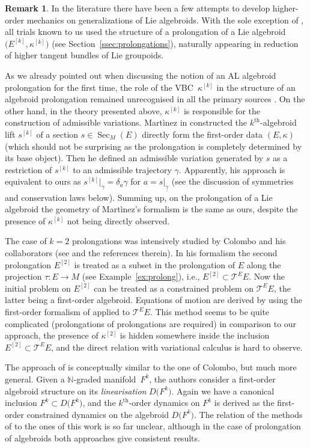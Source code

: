 \documentclass[pdftex]{sigma}
\newcommand{\grB}{{$\N$-graded manifold}}
\newcommand{\ZM}{{VBC}} %
\newcommand{\thh}[1]{#1^{\mathrm{th}}} %
\newcommand{\N}{\mathbb{N}}
\newcommand{\und}{\underline}
\newcommand{\Sec}{\operatorname{Sec}}
\newcommand{\ra}{\rightarrow}
\newcommand{\E}[1]{E^{[#1]}} %
\numberwithin{equation}{section}
\theoremstyle{definition}
\newtheorem{rem}[thm]{Remark}
\begin{document}
\begin{rem}\label{rem:var_calc}In the literature there have been a few attempts to develop higher-order mechanics on generalizations of Lie algebroids. With the sole exception of \cite{BGG_2015}, all trials known to us used the structure of a prolongation of a Lie algebroid $\big(\E{k},\kappa^{[k]}\big)$ (see Section~\ref{ssec:prolongations}), naturally appearing in reduction of higher tangent bundles of Lie groupoids.

As we already pointed out when discussing the notion of an AL algebroid prolongation for the first time, the role of the \ZM\ $\kappa^{[k]}$ in the structure of an algebroid prolongation remained unrecognised in all the primary sources \cite{Col_deDiego_seminar_2011, Martinez_2015, Saunders_2004}. On the other hand, in the theory presented above, $\kappa^{[k]}$ is responsible for the construction of admissible variations. Mart\`{i}nez in \cite{Martinez_2015} constructed the $\thh{k}$-algebroid lift $s^{[k]}$ of a section $s\in\Sec_M(E)$ directly form the first-order data $(E,\kappa)$ (which should not be surprising as the prolongation is completely determined by its base object). Then he defined an admissible variation generated by $s$ as a restriction of $s^{[k]}$ to an admissible trajectory $\gamma$. Apparently, his approach is equivalent to ours as $s^{[k]}|_\gamma=\delta_a\gamma$ for $a=s|_{\und{\gamma}}$ (see the discussion of symmetries and conservation laws below). Summing up, on the prolongation of a Lie algebroid the geometry of Mart\`{i}nez's formalism is the same as ours, despite the presence of $\kappa^{[k]}$ not being directly observed.

The case of $k=2$ prolongations was intensively studied by Colombo and his collaborators (see \cite{Abrunheiro_Colombo_2018, Colombo_2017} and the references therein). In his formalism the second prolongation $\E 2$ is treated as a subset in the prolongation of $E$ along the projection $\tau\colon E\ra M$ (see Example~\ref{ex:prolong}), i.e., $\E 2\subset \mathcal{T}^EE$. Now the initial problem on $\E 2$ can be treated as a constrained problem on $ \mathcal{T}^EE$, the latter being a first-order algebroid. Equations of motion are derived by using the first-order formalism of \cite{Martinez_geom_form_mech_lie_alg_2001} applied to $\mathcal{T}^EE$. This method seems to be quite complicated (prolongations of prolongations are required) in comparison to our approach, the presence of $\kappa^{[2]}$ is hidden somewhere inside the inclusion $\E 2\subset \mathcal{T}^EE$, and the direct relation with variational calculus is hard to observe.

The approach of \cite{BGG_2015} is conceptually similar to the one of Colombo, but much more general. Given a \grB\ $F^k$, the authors consider a first-order algebroid structure on its \emph{linearisation} $D\big(F^k\big)$. Again we have a canonical inclusion $F^k\subset D\big(F^k\big)$, and the $\thh{k}$-order dynamics on $F^k$ is derived as the first-order constrained dynamics on the algebroid $D\big(F^k\big)$. The relation of the methods of \cite{BGG_2015} to the ones of this work is so far unclear, although in the case of prolongation of algebroids both approaches give consistent results.
\end{rem}
\end{document}
